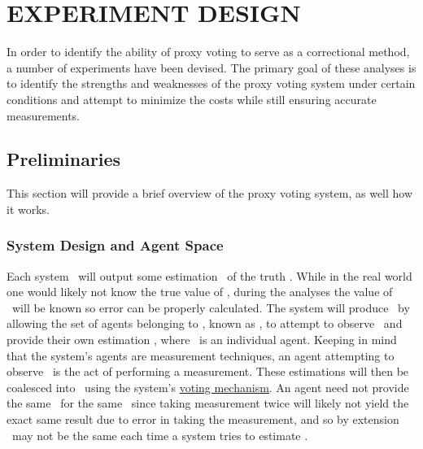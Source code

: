%
%

\chapter{EXPERIMENT DESIGN}\label{ch:experiment-design}
In order to identify the ability of proxy voting to serve as a correctional
method, a number of experiments have been devised.
The primary goal of these analyses is to identify the strengths and
weaknesses of the proxy voting system under certain conditions and attempt to minimize
the costs while still ensuring accurate measurements.


\section{Preliminaries}\label{sec:preliminaries}
This section will provide a brief overview of the proxy voting system, as well how it
works.


\subsection{System Design and Agent Space}
\label{subsec:system-design-and-agent-space}
Each system \system\ will output some estimation \systemtruth\ of the truth
\truth.
While in the real world one would likely not know the true value of \truth, during the
analyses the value of \truth\ will be known so error can be properly calculated.
The system will produce \systemtruth\ by allowing the set of agents belonging to
\system, known as \systemagents, to attempt to observe \truth\ and provide their own
estimation \agenttruth, where \agent\ is an individual agent.
Keeping in mind that the system's agents are measurement techniques, an agent
attempting to observe \truth\ is the act of performing a measurement.
These estimations will then be coalesced into \systemtruth\ using
the system's \hyperref[subsec:voting-mechanisms]{voting mechanism}.
An agent need not provide the same \agenttruth\ for the same \truth\ since taking
measurement twice will likely not yield the exact same result due to error in taking
the measurement, and so by extension \systemtruth\ may not be the same each time a
system tries to estimate \truth.

